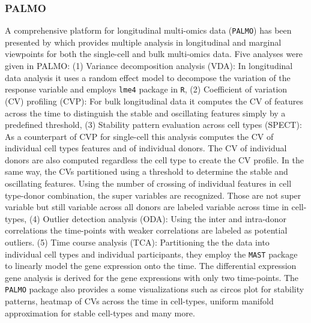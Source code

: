 \documentclass[]{article}
\begin{document}
		\subsubsection{PALMO}
		A comprehensive platform for longitudinal multi-omics data (\texttt{PALMO}) has been presented by \cite{Vasaikaretal2023} which provides multiple analysis in longitudinal and marginal viewpoints for both the single-cell and bulk multi-omics data. Five analyses were given in PALMO: (1) Variance decomposition analysis (VDA): In longitudinal data analysis it uses a random effect model to decompose the variation of the response variable and employs \texttt{lme4} package in \texttt{R}, (2) Coefficient of variation (CV) profiling (CVP): For bulk longitudinal data it computes the CV of features across the time to distinguish the stable and oscillating features simply by a predefined threshold, (3) Stability pattern evaluation across cell types (SPECT): As a counterpart of CVP for single-cell this analysis computes the CV of individual cell types features and of individual donors. The CV of individual donors are also computed regardless the cell type to create the CV profile. In the same way, the CVs partitioned using a threshold to determine the stable and oscillating features. Using the number of crossing of individual features in cell type-donor combination, the super variables are recognized. Those are not super variable but still variable across all donors are labeled variable across time in cell-types, (4) Outlier detection analysis (ODA): Using the inter and intra-donor correlations the time-points with weaker correlations are labeled as potential outliers. (5) Time course analysis (TCA): Partitioning the the data into individual cell types and individual participants, they employ the \texttt{MAST} package to linearly model the gene expression onto the time. The differential expression gene analysis is derived for the gene expressions with only two time-points. The \texttt{PALMO} package also provides a some visualizations such as circos plot for stability patterns, heatmap of CVs across the time in cell-types, uniform manifold approximation for stable cell-types and many more. 
		
\end{document}
